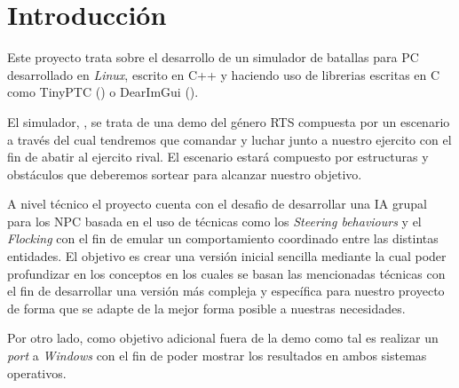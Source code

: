 \chapter{Introducción}
\label{intro}
Este proyecto trata sobre el desarrollo de un simulador de batallas para \ac{PC}
desarrollado en \textit{Linux}, escrito en C++ y haciendo uso de librerias escritas en
C como TinyPTC () o DearImGui ().

El simulador, , se trata de una demo del género \ac{RTS}
compuesta por un escenario a través del cual tendremos que comandar y luchar junto a
nuestro ejercito con el fin de abatir al ejercito rival. El escenario estará compuesto
por estructuras y obstáculos que deberemos sortear para alcanzar nuestro objetivo.

A nivel técnico el proyecto cuenta con el desafio de desarrollar una \ac{IA} grupal
para los \ac{NPC} basada en el uso de técnicas como los \textit{Steering behaviours} 
y el \textit{Flocking} con el fin de emular un comportamiento coordinado entre las
distintas entidades. El objetivo es crear una versión inicial sencilla mediante la 
cual poder profundizar en los conceptos en los cuales se basan las mencionadas técnicas
con el fin de desarrollar una versión más compleja y específica para nuestro proyecto
de forma que se adapte de la mejor forma posible a nuestras necesidades.

Por otro lado, como objetivo adicional fuera de la demo como tal es realizar
un \textit{port} a \textit{Windows} con el fin de poder mostrar los resultados
en ambos sistemas operativos.



